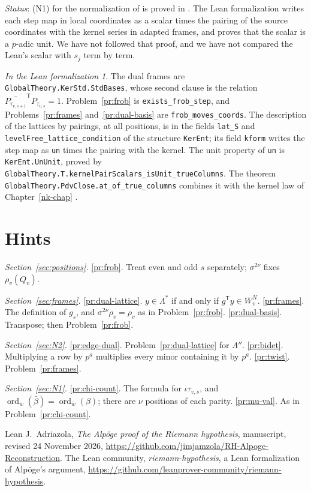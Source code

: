 \documentclass[reqno]{amsart}
\newcounter{chap}
\theoremstyle{definition}
\theoremstyle{plain}
\theoremstyle{remark}
\newtheorem*{leanremark}{In the Lean formalization}
\newcommand{\ord}{\operatorname{ord}}
\newcommand{\tl}[1]{\texttt{#1}}
\begin{document}
\emph{Status}: (N1) for the normalization of \cite[Def.~11.23]{Adr} is proved in \cite[Prop.~11.27]{Adr}.  The Lean formalization writes each step map in local coordinates as a scalar times the pairing of the source coordinates with the kernel series in adapted frames, and proves that the scalar is a \(p\)-adic unit.  We have not followed that proof, and we have not compared the Lean's scalar with \(s_j\) term by term.

\begin{leanremark}\sloppy
The dual frames are \tl{GlobalTheory.KerStd.StdBases}, whose second clause is the relation \(\overline{P_{\tau_{v,s+1}}}^{\mathsf T}P_{\tau_{v,s}}=1\).  Problem~\ref{pr:frob} is \tl{exists\_frob\_step}, and Problems~\ref{pr:frames} and~\ref{pr:dual-basis} are \tl{frob\_moves\_coords}.  The description of the lattices by pairings, at all positions, is in the fields \tl{lat\_S} and \tl{levelFree\_lattice\_condition} of the structure \tl{KerEnt}; its field \tl{kform} writes the step map as \tl{un} times the pairing with the kernel.  The unit property of \tl{un} is \tl{KerEnt.UnUnit}, proved by \tl{GlobalTheory.T.kernelPairScalars\_isUnit\_trueColumns}.  The theorem \tl{GlobalTheory.PdvClose.at\_of\_true\_columns} combines it with the kernel law of Chapter~\ref{nk-chap} \cite{Lean}.
\end{leanremark}

\section*{Hints}
\noindent\emph{Section~\ref{sec:positions}.}
\ref{pr:frob}. Treat even and odd \(s\) separately; \(\sigma^{2\nu}\) fixes \(\rho_v(Q_v)\).

\noindent\emph{Section~\ref{sec:frames}.}
\ref{pr:dual-lattice}. \(y\in\Lambda^*\) if and only if \(g^{\mathsf T}y\in W_v^N\).
\ref{pr:frames}. The definition of \(g_s\), and \(\sigma^{2\nu}\rho_v=\rho_v\) as in Problem~\ref{pr:frob}.
\ref{pr:dual-basis}. Transpose; then Problem~\ref{pr:frob}.

\noindent\emph{Section~\ref{sec:N2}.}
\ref{pr:edge-dual}. Problem~\ref{pr:dual-lattice} for \(\Lambda''\).
\ref{pr:bidet}. Multiplying a row by \(p^{a}\) multiplies every minor containing it by \(p^{a}\).
\ref{pr:twist}. Problem~\ref{pr:frames}.

\noindent\emph{Section~\ref{sec:N1}.}
\ref{pr:chi-count}. The formula for \(\iota\tau_{v,s}\), and \(\ord_w(\bar\beta)=\ord_{\bar w}(\beta)\); there are \(\nu\) positions of each parity.
\ref{pr:mu-val}. As in Problem~\ref{pr:chi-count}.

\begin{thebibliography}{Lean}
J.~Adriazola, \emph{The Alp\"oge proof of the Riemann hypothesis}, manuscript, revised 24 November 2026, \url{https://github.com/jimjamzola/RH-Alpoge-Reconstruction}.
 The Lean community, \emph{riemann-hypothesis}, a Lean formalization of Alp\"oge's argument, \url{https://github.com/leanprover-community/riemann-hypothesis}.
\end{thebibliography}
\end{document}
